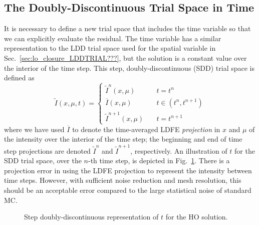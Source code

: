 \subsection{The Doubly-Discontinuous Trial Space in Time}

It is necessary to define a new trial space that includes the time variable so that we can explicitly evaluate the residual.
The time variable has a similar representation to the LDD trial space used for the
spatial variable
in Sec.~\ref{sec:lo_closure_LDDTRIAL???}, but the solution is a constant value over
the interior of the time step. This step, doubly-discontinuous (SDD) trial space is defined as
\begin{equation}\label{eq:time_space}
    \tilde I(x,\mu,t) = \left \{ \begin{array}{cl}
        \tilde I^{n}(x,\mu)  & \quad t = t^n \\ 
        \overline I(x,\mu)  & \quad t \in (t^{n},t^{n+1}) \\               
      \tilde I^{n+1}(x,\mu)   &  \quad        t = t^{n+1}
    \end{array}           \right.
\end{equation}
where we have used $\overline I$ to denote the time-averaged LDFE \emph{projection} in $x$
and $\mu$ of the intensity over the interior of the time step;  the beginning and end of
time step projections are denoted $\tilde I^{n}$ and $\tilde I^{n+1}$, respectively.   An
illustration of $t$ for the SDD trial space, over the $n$-th time step, 
is depicted in Fig.~\ref{fig:dd_time}.    There is a projection error in using the LDFE projection to represent the intensity between time steps.  However, with
sufficient noise reduction and mesh resolution, this should be an acceptable error
compared to the large statistical noise of standard MC.
\begin{figure}[H]
    \centering
    \begin{center}
    \end{center}
    \caption{Step doubly-discontinuous representation of $t$ for the HO solution.}
    \label{fig:dd_time}
\end{figure}

